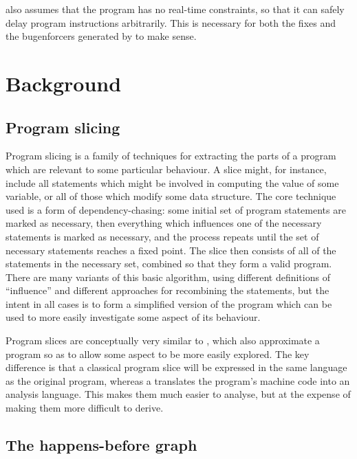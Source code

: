 {\Technique} also assumes that the program has no real-time
constraints, so that it can safely delay program instructions
arbitrarily.  This is necessary for both the fixes and the
\glspl{bugenforcer} generated by {\technique} to make sense.

\section{Background}


\subsection{Program slicing}

Program slicing\cite{Weiser1981} is a family of techniques for
extracting the parts of a program which are relevant to some
particular behaviour.  A slice might, for instance, include all
statements which might be involved in computing the value of some
variable, or all of those which modify some data structure.  The core
technique used is a form of dependency-chasing: some initial set of
program statements are marked as necessary, then everything which
influences one of the necessary statements is marked as necessary, and
the process repeats until the set of necessary statements reaches a
fixed point.  The slice then consists of all of the statements in the
necessary set, combined so that they form a valid program.  There are
many variants of this basic algorithm, using different definitions of
``influence'' and different approaches for recombining the statements,
but the intent in all cases is to form a simplified version of the
program which can be used to more easily investigate some aspect of
its behaviour.

Program slices are conceptually very similar to {\StateMachines},
which also approximate a program so as to allow some aspect to be more
easily explored.  The key difference is that a classical program slice
will be expressed in the same language as the original program,
whereas a {\StateMachine} translates the program's machine code into
an analysis language.  This makes them much easier to analyse, but at
the expense of making them more difficult to derive.

\subsection{The happens-before graph}


